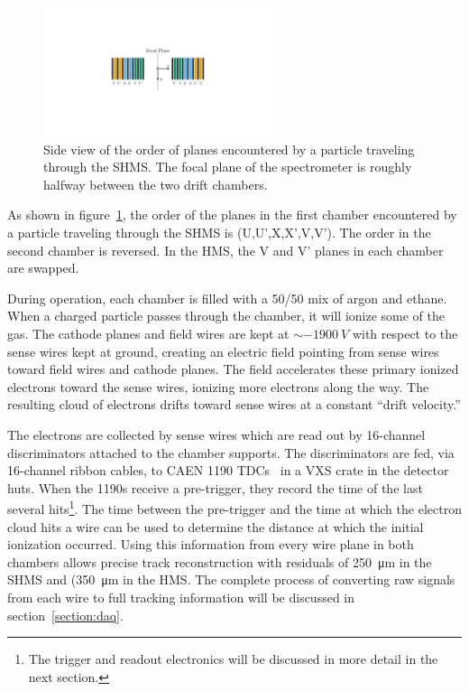\begin{figure}[!h]
    \centering
    \includegraphics[width=0.6\textwidth]{chap3/dc_plane_order.pdf}
    \caption{Side view of the order of planes encountered by a particle
             traveling through the SHMS. The focal plane of the spectrometer
             is roughly halfway between the two drift chambers.}
    \label{fig:shms_plane_order}
\end{figure}

As shown in figure~\ref{fig:shms_plane_order}, the order of the planes in the
first chamber encountered by a particle traveling through the SHMS is
(U,U',X,X',V,V').
The order in the second chamber is reversed.
In the HMS, the V and V' planes in each chamber are swapped.

During operation, each chamber is filled with a 50/50 mix of argon and ethane.
When a charged particle passes through the chamber, it will ionize some of
the gas.
The cathode planes and field wires are kept at $\sim-\SI{1900}{V}$ with respect
to the sense wires kept at ground, creating an electric field pointing from
sense wires toward field wires and cathode planes.
The field accelerates these primary ionized electrons toward the sense wires,
ionizing more electrons along the way.
The resulting cloud of electrons drifts toward sense wires at a
constant ``drift velocity.''

The electrons are collected by sense wires which are read out by
16-channel discriminators attached to the chamber supports.
The discriminators are fed, via 16-channel ribbon cables, to CAEN 1190
TDCs~\cite{CAEN_1190_manual} in a VXS crate in the detector huts.
When the 1190s receive a pre-trigger, they record the time of the last several
hits\footnote{The trigger and readout electronics will be discussed in more
detail in the next section.}.
The time between the pre-trigger and the time at which the electron cloud hits
a wire can be used to determine the distance at which the initial ionization
occurred.
Using this information from every wire plane in both chambers allows
precise track reconstruction with residuals of \SI{250}{\micro\meter} in the
SHMS and (\SI{350}{\micro\meter} in the HMS.
The complete process of converting raw signals from each wire to full tracking
information will be discussed in section~\ref{section:daq}.

